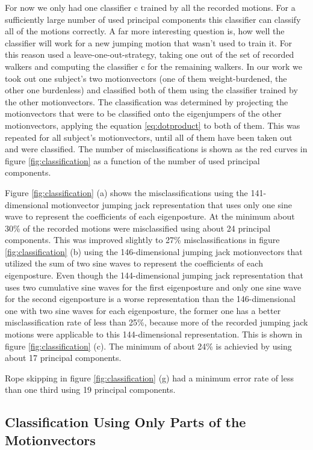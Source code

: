 \documentclass[a4paper]{article}
\begin{document}
For now we only had one classifier c trained by all the recorded motions.
For a sufficiently large number of used principal components this classifier can classify all of the motions correctly.
A far more interesting question is, how well the classifier will work for a new jumping motion that wasn't used to train it.
For this reason \cite{origin} used a leave-one-out-strategy, taking one out of the set of recorded walkers and computing the classifier c for the remaining walkers.
In our work we took out one subject's two motionvectors (one of them weight-burdened, the other one burdenless) and classified both of them using the classifier trained by the other motionvectors.
The classification was determined by projecting the motionvectors that were to be classified onto the eigenjumpers of the other motionvectors, applying the equation \ref{eq:dotproduct} to both of them.
This was repeated for all subject's motionvectors, until all of them have been taken out and were classified.
The number of misclassifications is shown as the red curves in figure \ref{fig:classification} as a function of the number of used principal components.

Figure \ref{fig:classification} (a) shows the misclassifications using the 141-dimensional motionvector jumping jack representation that uses only one sine wave to represent the coefficients of each eigenposture.
At the minimum about 30\% of the recorded motions were misclassified using about 24 principal components.
This was improved slightly to 27\% misclassifications in figure \ref{fig:classification} (b) using the 146-dimensional jumping jack motionvectors that utilized the sum of two sine waves to represent the coefficients of each eigenposture.
Even though the 144-dimensional jumping jack representation that uses two cumulative sine waves for the first eigenposture and only one sine wave for the second eigenposture is a worse representation than the 146-dimensional one with two sine waves for each eigenposture, the former one has a better misclassification rate of less than 25\%, because more of the recorded jumping jack motions were applicable to this 144-dimensional representation.
This is shown in figure \ref{fig:classification} (c).
The minimum of about 24\% is achievied by using about 17 principal components.

Rope skipping in figure \ref{fig:classification} (g) had a minimum error rate of less than one third using 19 principal components.

\subsection{Classification Using Only Parts of the Motionvectors}
\end{document}
